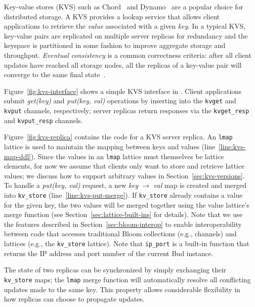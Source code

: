 Key-value stores (KVS) such as Chord~\cite{Stoica2001} and
Dynamo~\cite{DeCandia2007} are a popular choice for distributed storage. A KVS
provides a lookup service that allows client applications to retrieve the
\emph{value} associated with a given \emph{key}. In a typical KVS, key-value
pairs are replicated on multiple server replicas for redundancy and the keyspace
is partitioned in some fashion to improve aggregate storage and
throughput. \emph{Eventual consistency} is a common correctness criteria: after
all client updates have reached all storage nodes, all the replicas of a
key-value pair will converge to the same final state~\cite{Terry1995,vogels}.

Figure~\ref{fig:kvs-interface} shows a simple KVS interface in \lang. Client
applications submit \emph{get(key)} and \emph{put(key, val)} operations by
inserting into the \texttt{kvget} and \texttt{kvput} channels, respectively;
server replicas return responses via the \texttt{kvget\_resp} and
\texttt{kvput\_resp} channels.

Figure~\ref{fig:kvs-replica} contains the \lang code for a KVS server
replica. An \texttt{lmap} lattice is used to maintain the mapping between keys
and values (line~\ref{line:kvs-map-ddl}). Since the values in an \texttt{lmap}
lattice must themselves be lattice elements, for now we assume that clients only
want to store and retrieve lattice values; we discuss how to support arbitrary
values in Section~\ref{sec:kvs-versions}. To handle a \emph{put(key, val)}
request, a new \emph{key} $\to$ \emph{val} map is created and merged into
\texttt{kv\_store} (line~\ref{line:kvs-put-merge}). If \texttt{kv\_store}
already contains a value for the given key, the two values will be merged
together using the value lattice's merge function (see
Section~\ref{sec:lattice-built-ins} for details). Note that we use the \lang
features described in Section~\ref{sec:bloom-interop} to enable interoperability
between code that accesses traditional Bloom collections (e.g., channels) and
lattices (e.g., the \texttt{kv\_store} lattice).  Note that \texttt{ip\_port} is
a built-in function that returns the IP address and port number of the current
Bud instance.

The state of two replicas can be synchronized by simply exchanging their
\texttt{kv\_store} maps; the \texttt{lmap} merge function will automatically
resolve all conflicting updates made to the same key. This property allows
considerable flexibility in how replicas can choose to propagate updates.


